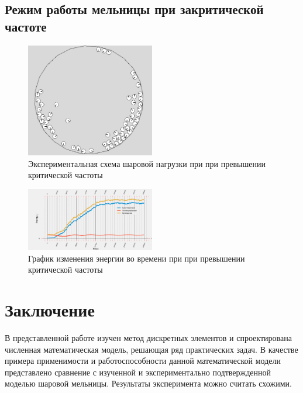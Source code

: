\documentclass[a4paper]{article}
\begin{document}
\subsection{Режим работы мельницы при закритической частоте}

\begin{figure}[H]
	\centering
	\includegraphics[width=0.5\textwidth]{kritic_result} 
	\caption{Экспериментальная схема шаровой нагрузки при при превышении критической частоты}
	\label{pic:kritic_result}
\end{figure} 

\begin{figure}[H]
	\centering
	\includegraphics[width=0.5\textwidth]{kritic_energy} 
	\caption{График изменения энергии во времени при при превышении критической частоты}
	\label{pic:kritic_energy}
\end{figure} 


\newpage

\section{Заключение}

В представленной работе изучен метод дискретных элементов и спроектирована численная математическая модель, решающая ряд практических задач.
В качестве примера применимости и работоспособности данной математической модели представлено сравнение с изученной и экспериментально подтвержденной моделью шаровой мельницы.
Результаты эксперимента можно считать схожими.

\newpage
\end{document}

